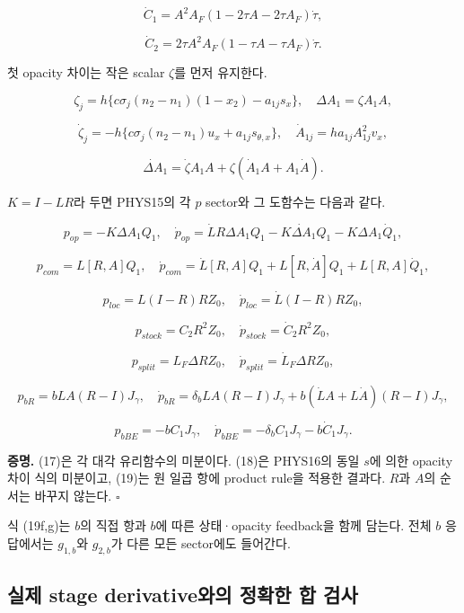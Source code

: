 \[
\dot C_1=A^2A_F(1-2\tau A-2\tau A_F)\dot\tau,
\]

\[
\dot C_2=2\tau A^2A_F(1-\tau A-\tau A_F)\dot\tau.
\tag{17}
\]

첫 opacity 차이는 작은 scalar \(\zeta\)를 먼저 유지한다.

\[
\zeta_j=h\{c\sigma_j(n_2-n_1)(1-x_2)-a_{1j}s_x\},
\quad\Delta A_1=\zeta A_1A,
\]

\[
\dot\zeta_j=-h\{c\sigma_j(n_2-n_1)u_x+a_{1j}s_{\theta,x}\},
\quad \dot A_{1j}=ha_{1j}A_{1j}^2v_x,
\]

\[
\boxed{\dot{\Delta A}_1=\dot\zeta A_1A
+\zeta(\dot A_1A+A_1\dot A).}
\tag{18}
\]

\(K=I-LR\)라 두면 PHYS15의 각 \(p\) sector와 그 도함수는 다음과 같다.

\[
p_{op}=-K\Delta A_1Q_1,
\quad
\boxed{\dot p_{op}=\dot LR\Delta A_1Q_1
-K\dot{\Delta A}_1Q_1-K\Delta A_1\dot Q_1,}
\tag{19a}
\]

\[
p_{com}=L[R,A]Q_1,
\quad
\boxed{\dot p_{com}=\dot L[R,A]Q_1
+L[R,\dot A]Q_1+L[R,A]\dot Q_1,}
\tag{19b}
\]

\[
p_{loc}=L(I-R)RZ_0,
\quad \boxed{\dot p_{loc}=\dot L(I-R)RZ_0,}
\tag{19c}
\]

\[
p_{stock}=C_2R^2Z_0,
\quad \boxed{\dot p_{stock}=\dot C_2R^2Z_0,}
\tag{19d}
\]

\[
p_{split}=L_F\Delta RZ_0,
\quad \boxed{\dot p_{split}=\dot L_F\Delta RZ_0,}
\tag{19e}
\]

\[
p_{bR}=bLA(R-I)J_\gamma,
\quad
\boxed{\dot p_{bR}=\delta_bLA(R-I)J_\gamma
+b(\dot LA+L\dot A)(R-I)J_\gamma,}
\tag{19f}
\]

\[
p_{bBE}=-bC_1J_\gamma,
\quad
\boxed{\dot p_{bBE}=-\delta_bC_1J_\gamma-b\dot C_1J_\gamma.}
\tag{19g}
\]

\textbf{증명.} (17)은 각 대각 유리함수의 미분이다. (18)은 PHYS16의 동일 \(s\)에 의한 opacity 차이 식의 미분이고, (19)는 원 일곱 항에 product rule을 적용한 결과다. \(R\)과 \(A\)의 순서는 바꾸지 않는다. \(\square\)

식 (19f,g)는 \(b\)의 직접 항과 \(b\)에 따른 상태·opacity feedback을 함께 담는다. 전체 \(b\) 응답에서는 \(g_{1,b}\)와 \(g_{2,b}\)가 다른 모든 sector에도 들어간다.

\hypertarget{uxc2e4uxc81c-stage-derivativeuxc640uxc758-uxc815uxd655uxd55c-uxd569-uxac80uxc0ac}{%
\subsection{실제 stage derivative와의 정확한 합 검사}\label{uxc2e4uxc81c-stage-derivativeuxc640uxc758-uxc815uxd655uxd55c-uxd569-uxac80uxc0ac}}

